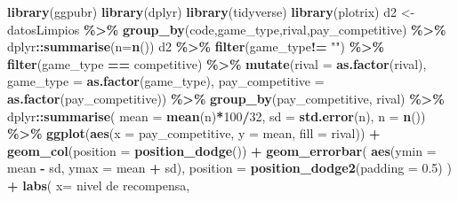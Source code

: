 \documentclass[
]{article}
\newenvironment{Shaded}{\begin{snugshade}}{\end{snugshade}}
\newcommand{\AttributeTok}[1]{\textcolor[rgb]{0.13,0.29,0.53}{#1}}
\newcommand{\DecValTok}[1]{\textcolor[rgb]{0.00,0.00,0.81}{#1}}
\newcommand{\FloatTok}[1]{\textcolor[rgb]{0.00,0.00,0.81}{#1}}
\newcommand{\FunctionTok}[1]{\textcolor[rgb]{0.13,0.29,0.53}{\textbf{#1}}}
\newcommand{\NormalTok}[1]{#1}
\newcommand{\OtherTok}[1]{\textcolor[rgb]{0.56,0.35,0.01}{#1}}
\newcommand{\SpecialCharTok}[1]{\textcolor[rgb]{0.81,0.36,0.00}{\textbf{#1}}}
\newcommand{\StringTok}[1]{\textcolor[rgb]{0.31,0.60,0.02}{#1}}
\begin{document}
\begin{Shaded}
\begin{Highlighting}[]
\FunctionTok{library}\NormalTok{(ggpubr)}
\FunctionTok{library}\NormalTok{(dplyr)}
\FunctionTok{library}\NormalTok{(tidyverse)}
\FunctionTok{library}\NormalTok{(plotrix)}
\NormalTok{d2 }\OtherTok{\textless{}{-}}\NormalTok{ datosLimpios }\SpecialCharTok{\%\textgreater{}\%}
    \FunctionTok{group\_by}\NormalTok{(code,game\_type,rival,pay\_competitive) }\SpecialCharTok{\%\textgreater{}\%} 
\NormalTok{  dplyr}\SpecialCharTok{::}\FunctionTok{summarise}\NormalTok{(}\AttributeTok{n=}\FunctionTok{n}\NormalTok{())  }
\NormalTok{d2 }\SpecialCharTok{\%\textgreater{}\%}  
  \FunctionTok{filter}\NormalTok{(game\_type}\SpecialCharTok{!=} \StringTok{""}\NormalTok{) }\SpecialCharTok{\%\textgreater{}\%} 
  \FunctionTok{filter}\NormalTok{(game\_type }\SpecialCharTok{==} \StringTok{\textquotesingle{}competitive\textquotesingle{}}\NormalTok{) }\SpecialCharTok{\%\textgreater{}\%}
  \FunctionTok{mutate}\NormalTok{(}\AttributeTok{rival =} \FunctionTok{as.factor}\NormalTok{(rival),}
              \AttributeTok{game\_type =} \FunctionTok{as.factor}\NormalTok{(game\_type),}
         \AttributeTok{pay\_competitive =} \FunctionTok{as.factor}\NormalTok{(pay\_competitive)) }\SpecialCharTok{\%\textgreater{}\%}
  \FunctionTok{group\_by}\NormalTok{(pay\_competitive, rival) }\SpecialCharTok{\%\textgreater{}\%}
\NormalTok{  dplyr}\SpecialCharTok{::}\FunctionTok{summarise}\NormalTok{(}
    \AttributeTok{mean =} \FunctionTok{mean}\NormalTok{(n)}\SpecialCharTok{*}\DecValTok{100}\SpecialCharTok{/}\DecValTok{32}\NormalTok{,}
    \AttributeTok{sd =} \FunctionTok{std.error}\NormalTok{(n),}
    \AttributeTok{n =} \FunctionTok{n}\NormalTok{()) }\SpecialCharTok{\%\textgreater{}\%}
  \FunctionTok{ggplot}\NormalTok{(}\FunctionTok{aes}\NormalTok{(}\AttributeTok{x =}\NormalTok{ pay\_competitive, }\AttributeTok{y =}\NormalTok{ mean, }\AttributeTok{fill =}\NormalTok{ rival)) }\SpecialCharTok{+}
  \FunctionTok{geom\_col}\NormalTok{(}\AttributeTok{position =} \FunctionTok{position\_dodge}\NormalTok{()) }\SpecialCharTok{+}
  \FunctionTok{geom\_errorbar}\NormalTok{(}
    \FunctionTok{aes}\NormalTok{(}\AttributeTok{ymin =}\NormalTok{ mean }\SpecialCharTok{{-}}\NormalTok{ sd, }\AttributeTok{ymax =}\NormalTok{ mean }\SpecialCharTok{+}\NormalTok{ sd), }
    \AttributeTok{position =} \FunctionTok{position\_dodge2}\NormalTok{(}\AttributeTok{padding =} \FloatTok{0.5}\NormalTok{)}
\NormalTok{  ) }\SpecialCharTok{+}
  \FunctionTok{labs}\NormalTok{(}
    \AttributeTok{x=} \StringTok{\textquotesingle{}nivel de recompensa\textquotesingle{}}\NormalTok{,}

\end{Highlighting}
\end{Shaded}
\end{document}
